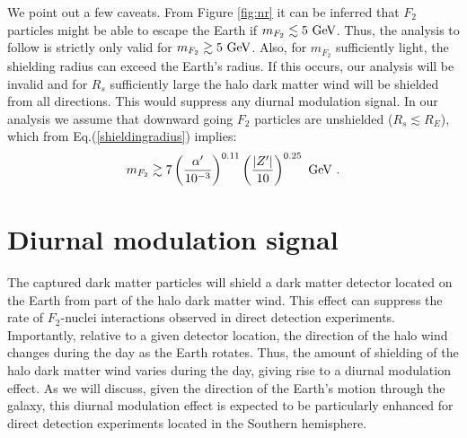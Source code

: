 \documentclass[12pt]{article}
\begin{document}
We point out a few caveats. From Figure \ref{fig:nr} it can be inferred that $F_2$ particles might be able to escape the Earth if $m _{F_2} \lesssim 5 \ \rm GeV$. Thus, the analysis to follow is strictly only valid for $m _{F_2} \gtrsim 5 \ {\rm GeV}$. Also, for $m _{F_2}$ sufficiently light, the shielding radius can exceed the Earth's radius. If this occurs, our analysis will be invalid and for $R_s$ sufficiently large the halo dark matter wind will be shielded from all directions. This would suppress any diurnal modulation signal. In our analysis we assume that downward going $F_2$ particles are unshielded ($R _s \lesssim R _E$), which from Eq.(\ref{shieldingradius}) implies:
%
\begin{eqnarray}
m _{F_2} \gtrsim 7 \left ( \frac{\alpha '}{10 ^{-3}} \right ) ^{0.11}\left ( \frac{|Z'|}{10} \right ) ^{0.25} \ \rm GeV \ .
\end{eqnarray}
%

\section{Diurnal modulation signal}

The captured dark matter particles will shield a dark matter detector located on the Earth from part of the halo dark matter wind. This effect can suppress the rate of $F_2$-nuclei interactions observed in direct detection experiments. Importantly, relative to a given detector location, the direction of the halo wind changes during the day as the Earth rotates. Thus, the amount of shielding of the halo dark matter wind varies during the day, giving rise to a diurnal modulation effect. As we will discuss, given the direction of the Earth's motion through the galaxy, this diurnal modulation effect is expected to be particularly enhanced for direct detection experiments located in the Southern hemisphere.
\end{document}
